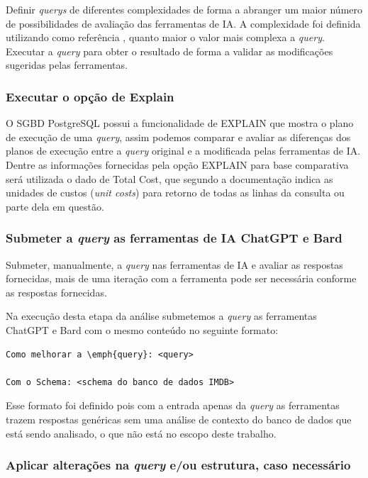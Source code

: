 \documentclass[12pt]{article}
\begin{document}
Definir \emph{querys} de diferentes complexidades de forma a abranger um maior número de possibilidades de avaliação das ferramentas de IA. A complexidade foi definida utilizando como referência \cite{subali2018new}, quanto maior o valor mais complexa a \emph{query}. Executar a \emph{query} para obter o resultado de forma a validar as modificações sugeridas pelas ferramentas.

\subsubsection{Executar o opção de Explain}

O SGBD PostgreSQL possui a funcionalidade de EXPLAIN \cite{postgresql_explain} que mostra o plano de execução de uma \emph{query}, assim podemos comparar e avaliar as diferenças dos planos de execução entre a \emph{query} original e a modificada pelas ferramentas de IA. 
Dentre as informações fornecidas pela opção EXPLAIN para base comparativa será utilizada o dado de Total Cost, que segundo a documentação indica as unidades de custos (\emph{unit costs}) para retorno de todas as linhas da consulta ou parte dela em questão.

\subsubsection{Submeter a \emph{query} as ferramentas de IA ChatGPT e Bard}

Submeter, manualmente, a \emph{query} nas ferramentas de IA e avaliar as respostas fornecidas, mais de uma iteração com a ferramenta pode ser necessária conforme as respostas fornecidas.

Na execução desta etapa da análise submetemos a \emph{query} as ferramentas ChatGPT e Bard com o mesmo conteúdo no seguinte formato:

\begin{lstlisting}
Como melhorar a \emph{query}: <query>

Com o Schema: <schema do banco de dados IMDB>
\end{lstlisting}

Esse formato foi definido pois com a entrada apenas da \emph{query} as ferramentas trazem respostas genéricas sem uma análise de contexto do banco de dados que está sendo analisado, o que não está no escopo deste trabalho.

\subsubsection{Aplicar alterações na \emph{query} e/ou estrutura, caso necessário}
\end{document}
